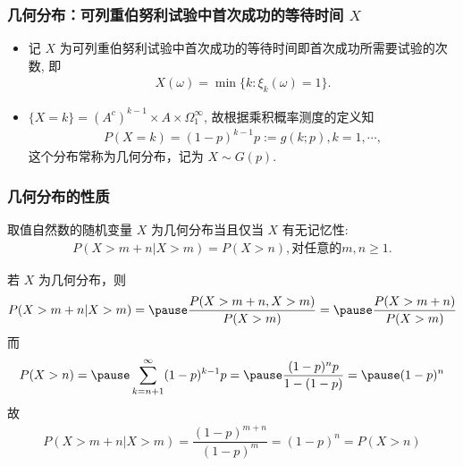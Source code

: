 \documentclass[Prob-All.tex]{subfiles}
\begin{document}
\begin{frame}
	\frametitle{几何分布：可列重伯努利试验中首次成功的等待时间 $X$}
	\begin{itemize}[<+-|alert@+>]
		\item 记 $X$ 为可列重伯努利试验中首次成功的等待时间即首次成功所需要试验的次数, 即
		      \begin{eqnarray*}
			      X(\omega)=\min\{k:\xi_k(\omega)=1\}.
		      \end{eqnarray*}
		\item $\{X=k\}=\left(A^{c}\right)^{k-1} \times A \times \Omega_{1}^{\infty}$, 故根据乘积概率测度的定义知
		      \begin{eqnarray*}
			      P(X=k)=(1-p)^{k-1}p:=g(k;p), k=1,\cdots,
		      \end{eqnarray*}
		      这个分布常称为几何分布，记为 $X\sim G (p)$.
	\end{itemize}
\end{frame}
\begin{frame}
	\frametitle{几何分布的性质}
	\begin{thm}
		取值自然数的随机变量 $X$ 为几何分布当且仅当 $X$ 有无记忆性:
		\begin{eqnarray}\label{eq:memory}
			P (X>m+n|X>m)=P (X>n), \mbox{对任意的} m,n \ge 1.
		\end{eqnarray}
	\end{thm}
	\zheng 若 $X$ 为几何分布，则
	\begin{eqnarray*}
		P(X>m+n|X>m)=\pause \dfrac{P(X>m+n,X>m)}{P(X>m)}=\pause \dfrac{P(X>m+n)}{P(X>m)}
	\end{eqnarray*}
	\pause 而
	\begin{eqnarray*}
		P(X>n)=\pause \sum_{k=n+1}^\infty (1-p)^{k-1}p=\pause \dfrac{(1-p)^{n}p}{1-(1-p)}=\pause (1-p)^n
	\end{eqnarray*}
	\pause 故
	\begin{eqnarray*}
		P(X>m+n|X>m)=\dfrac{(1-p)^{m+n}}{(1-p)^m}=(1-p)^n=P(X>n)
	\end{eqnarray*}



\end{frame}
\end{document}
